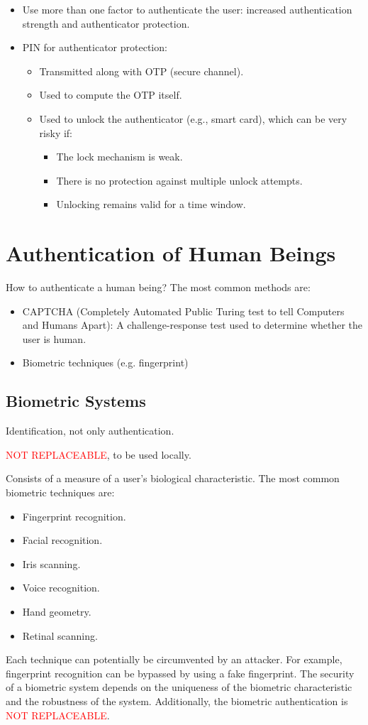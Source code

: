 \begin{itemize}
    \item Use more than one factor to authenticate the user: increased authentication strength and authenticator protection.
    \item PIN for authenticator protection:
    \begin{itemize}
        \item Transmitted along with OTP (secure channel).
        \item Used to compute the OTP itself.
        \item Used to unlock the authenticator (e.g., smart card), which can be very risky if:
        \begin{itemize}
            \item The lock mechanism is weak.
            \item There is no protection against multiple unlock attempts.
            \item Unlocking remains valid for a time window.
        \end{itemize}
    \end{itemize}
\end{itemize}
\section{Authentication of Human Beings}
How to authenticate a human being? The most common methods are:
\begin{itemize}
    \item CAPTCHA (Completely Automated Public Turing test to tell Computers and Humans Apart): A challenge-response test used to determine whether the user is human.
    \item Biometric techniques (e.g. fingerprint)
\end{itemize}

\subsection{Biometric Systems}
\begin{center}
    Identification, not only authentication.

    \textcolor{Red}{NOT REPLACEABLE}, to be used locally.
\end{center}
Consists of a measure of a user's biological characteristic. The most common biometric techniques are: 
\begin{itemize}
    \item Fingerprint recognition.
    \item Facial recognition.
    \item Iris scanning.
    \item Voice recognition.
    \item Hand geometry.
    \item Retinal scanning.
\end{itemize}
Each technique can potentially be circumvented by an attacker. For example, fingerprint recognition can be bypassed by using a fake fingerprint. The security of a biometric system depends on the uniqueness of the biometric characteristic and the robustness of the system. Additionally, the biometric authentication is \textcolor{Red}{NOT REPLACEABLE}.

